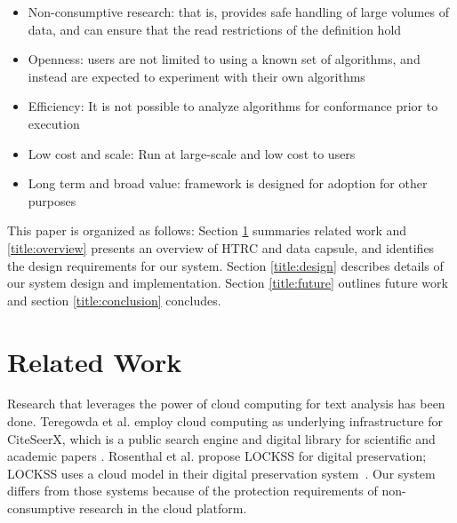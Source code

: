 \documentclass{acm_proc_article-sp}
\begin{document}
\begin{itemize}
\item Non-consumptive research: that is, provides safe handling of large volumes of data, and
can ensure that the read restrictions of the definition hold
\item Openness: users are not limited to using a known set of algorithms, and instead are
expected to experiment with their own algorithms
\item Efficiency: It is not possible to analyze algorithms for conformance prior to
execution
\item Low cost and scale:  Run at large-scale and low cost to users
\item  Long term and broad value:  framework is designed for adoption for other
purposes
\end{itemize}


This paper is organized as follows: Section \ref{title:related} summaries related work and \ref{title:overview} presents an overview of HTRC and data capsule, and identifies the design requirements for our system. Section \ref{title:design} describes details of our system design and implementation. Section \ref{title:future} outlines future work and section \ref{title:conclusion} concludes.

\section{Related Work} \label{title:related}

Research that leverages the power of cloud computing for text analysis has been done. Teregowda et al. employ cloud computing as underlying infrastructure for CiteSeerX, which is a public search engine and digital library for scientific and academic papers \cite{Teregowda:cloud}. Rosenthal et al. propose LOCKSS for digital preservation; LOCKSS uses a cloud model in their digital preservation system~\cite{Rosenthal:preservation}. Our system differs from those systems because of the protection requirements of non-consumptive research in the cloud platform.
\end{document}
